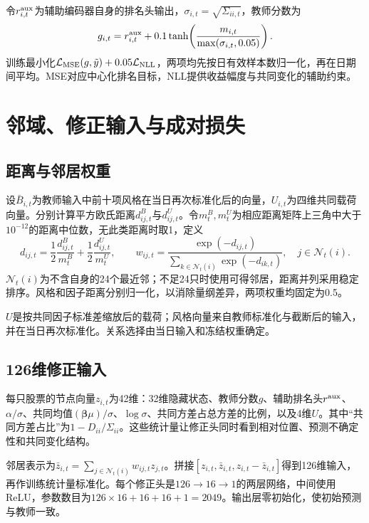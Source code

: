 \documentclass[UTF8,11pt,a4paper,fontset=fandol]{ctexart}
\newcommand{\Beta}{\bm{\beta}}
\begin{document}
令$r^{\rm aux}_{i,t}$为辅助编码器自身的排名头输出，$\sigma_{i,t}=\sqrt{\Sigma_{ii,t}}$，教师分数为
\begin{equation}
 g_{i,t}=r^{\rm aux}_{i,t}+0.1\tanh\!\left(\frac{m_{i,t}}{\max(\sigma_{i,t},0.05)}\right).
 \label{eq:teacherscore}
\end{equation}
训练最小化$\mathcal L_{\rm MSE}(g,\tilde y)+0.05\mathcal L_{\rm NLL}$，两项均先按日有效样本数归一化，再在日期间平均。MSE对应中心化排名目标，NLL提供收益幅度与共同变化的辅助约束。

\section{邻域、修正输入与成对损失}\label{app:peer}
\subsection{距离与邻居权重}
设$\bar B_{i,t}$为教师输入中前十项风格在当日再次标准化后的向量，$U_{i,t}$为四维共同载荷向量。分别计算平方欧氏距离$d^B_{ij,t}$与$d^U_{ij,t}$。令$m^B_t,m^U_t$为相应距离矩阵上三角中大于$10^{-12}$的距离中位数，无此类距离时取1，定义
\begin{equation}
 d_{ij,t}=\frac12\frac{d^B_{ij,t}}{m^B_t}+\frac12\frac{d^U_{ij,t}}{m^U_t},\qquad
 w_{ij,t}=\frac{\exp(-d_{ij,t})}{\sum_{k\in\mathcal N_t(i)}\exp(-d_{ik,t})},\quad j\in\mathcal N_t(i).
 \label{eq:neighbors}
\end{equation}
$\mathcal N_t(i)$为不含自身的24个最近邻；不足24只时使用可得邻居，距离并列采用稳定排序。风格和因子距离分别归一化，以消除量纲差异，两项权重均固定为0.5。

$U$是按共同因子标准差缩放后的载荷；风格向量来自教师标准化与截断后的输入，并在当日再次标准化。关系选择由当日输入和冻结权重确定。

\subsection{126维修正输入}
每只股票的节点向量$z_{i,t}$为42维：32维隐藏状态、教师分数$g$、辅助排名头$r^{\rm aux}$、$\alpha/\sigma$、共同均值$(\Beta\mu)/\sigma$、$\log\sigma$、共同方差占总方差的比例，以及4维$U$。其中“共同方差占比”为$1-D_{ii}/\Sigma_{ii}$。这些统计量让修正头同时看到相对位置、预测不确定性和共同变化结构。

邻居表示为$\bar z_{i,t}=\sum_{j\in\mathcal N_t(i)}w_{ij,t}z_{j,t}$。拼接$[z_{i,t},\bar z_{i,t},z_{i,t}-\bar z_{i,t}]$得到126维输入，再作训练统计量标准化。每个修正头是$126\to16\to1$的两层网络，中间使用ReLU，参数数目为$126\times16+16+16+1=2049$。输出层零初始化，使初始预测与教师一致。
\end{document}
